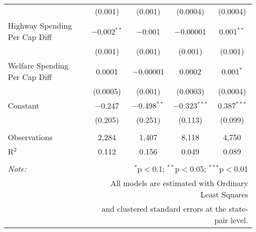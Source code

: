 \begin{table}[!htbp]
\begin{tabular}{@{\extracolsep{5pt}}lcccc}
  & (0.001) & (0.001) & (0.0004) & (0.0004) \\ 
  Highway Spending Per Cap Diff & $-$0.002$^{**}$ & $-$0.001 & $-$0.00001 & 0.001$^{**}$ \\ 
  & (0.001) & (0.001) & (0.001) & (0.001) \\ 
  Welfare Spending Per Cap Diff & 0.0001 & $-$0.00001 & 0.0002 & 0.001$^{*}$ \\ 
  & (0.0005) & (0.001) & (0.0003) & (0.0004) \\ 
  Constant & $-$0.247 & $-$0.498$^{**}$ & $-$0.323$^{***}$ & 0.387$^{***}$ \\ 
  & (0.205) & (0.251) & (0.113) & (0.099) \\ 
 \hline \\[-1.8ex] 
Observations & 2,284 & 1,407 & 8,118 & 4,750 \\ 
R$^{2}$ & 0.112 & 0.156 & 0.049 & 0.089 \\ 
\hline 
\hline \\[-1.8ex] 
\textit{Note:}  & \multicolumn{4}{r}{$^{*}$p$<$0.1; $^{**}$p$<$0.05; $^{***}$p$<$0.01} \\ 
 & \multicolumn{4}{r}{All models are estimated with Ordinary Least Squares} \\ 
 & \multicolumn{4}{r}{and clustered standard errors at the state-pair level.} \\ 
\end{tabular} 
\end{table} 
